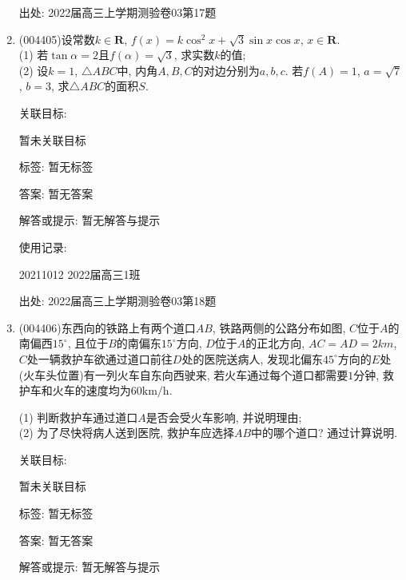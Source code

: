\documentclass[10pt,a4paper]{article}
\begin{document}
\begin{enumerate}[1.]
出处: 2022届高三上学期测验卷03第17题
\item { (004405)}设常数$k\in \mathbf{R}$, $f(x)=k\cos^2x+\sqrt 3\sin x\cos x$, $x\in \mathbf{R}$.\\
(1) 若$\tan \alpha =2$且$f(\alpha)=\sqrt 3$, 求实数$k$的值;\\
(2) 设$k=1$, $\triangle ABC$中, 内角$A,B,C$的对边分别为$a,b,c$. 若$f(A)=1$, $a=\sqrt 7$, $b=3$, 求$\triangle ABC$的面积$S$.


关联目标:

暂未关联目标



标签: 暂无标签

答案: 暂无答案

解答或提示: 暂无解答与提示

使用记录:

20211012	2022届高三1班		


出处: 2022届高三上学期测验卷03第18题
\item { (004406)}东西向的铁路上有两个道口$AB$, 铁路两侧的公路分布如图, $C$位于$A$的南偏西$15^\circ$, 且位于$B$的南偏东$15^\circ$方向, $D$位于$A$的正北方向, $AC=AD=2km$, $C$处一辆救护车欲通过道口前往$D$处的医院送病人, 发现北偏东$45^\circ$方向的$E$处(火车头位置)有一列火车自东向西驶来, 若火车通过每个道口都需要$1$分钟, 救护车和火车的速度均为$60\text{km/h}$.
\begin{center}
\end{center}
(1) 判断救护车通过道口$A$是否会受火车影响, 并说明理由;\\
(2) 为了尽快将病人送到医院, 救护车应选择$AB$中的哪个道口? 通过计算说明.


关联目标:

暂未关联目标



标签: 暂无标签

答案: 暂无答案

解答或提示: 暂无解答与提示


\end{enumerate}
\end{document}
